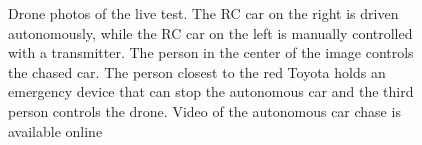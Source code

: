\documentclass{ctuthesis/ctuthesis}
\begin{document}
\begin{figure}[]
    \centering
    \quad
    \caption[Drone photos of the live test.]{Drone photos of the live test. The RC car on the right is driven autonomously, while the RC car on the left is manually controlled with a transmitter. The person in the center of the image controls the chased car. The person closest to the red Toyota holds an emergency device that can stop the autonomous car and the third person controls the drone. Video of the autonomous car chase is available online \cite{my_yt_video}}\label{f:video}
\end{figure}
\end{document}
